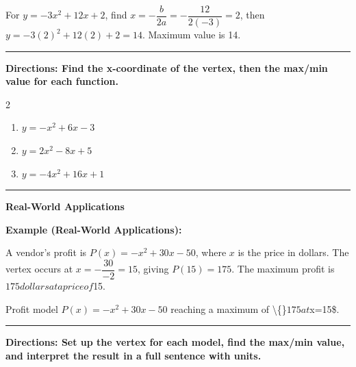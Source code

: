 \documentclass[12pt]{article}
\begin{document}
For $y=-3x^2+12x+2$, find $x=-\dfrac{b}{2a}=-\dfrac{12}{2(-3)}=2$, then $y=-3(2)^2+12(2)+2=14$. Maximum value is 14.

\vspace{0.2cm}\hrule\vspace{0.35cm}
\textbf{Directions: Find the x-coordinate of the vertex, then the max/min value for each function.}

\begin{multicols}{2}
\begin{enumerate}[label=\textbf{\arabic*.}, start=5, itemsep=2cm]
  \item $\displaystyle y=-x^2+6x-3$
  \item $\displaystyle y=2x^2-8x+5$
  \item $\displaystyle y=-4x^2+16x+1$
\end{enumerate}
\end{multicols}
\vspace{0.25cm}\hrule\vspace{0.35cm}

\begin{center}{\Large \textbf{Real-World Applications}}\end{center}\vspace{0.2cm}
\textbf{Example (Real-World Applications):}

A vendor's profit is $P(x)=-x^2+30x-50$, where $x$ is the price in dollars. The vertex occurs at $x=-\dfrac{30}{-2}=15$, giving $P(15)=175$. The maximum profit is $175 dollars at a price of $15.

\begin{center}\end{center}
{\small\centering Profit model $P(x)=-x^2+30x-50$ reaching a maximum of \textbackslash\{\}$175 at $x=15\$.\par}
\vspace{0.2cm}\hrule\vspace{0.35cm}
\textbf{Directions: Set up the vertex for each model, find the max/min value, and interpret the result in a full sentence with units.}
\end{document}
